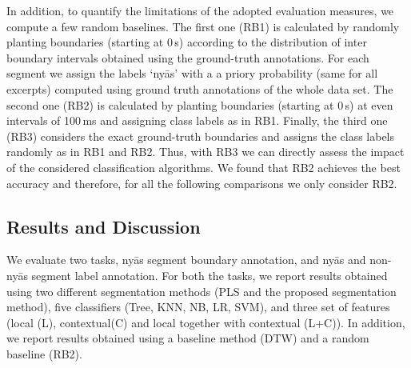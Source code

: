 {In addition, to quantify the limitations of the adopted evaluation measures, we compute a few random baselines. The first one (RB1) is calculated by randomly planting boundaries (starting at 0\,s) according to the distribution of inter boundary intervals obtained using the ground-truth annotations. For each segment we assign the labels `ny\={a}s' with a a priory probability (same for all excerpts) computed using ground truth annotations of the whole data set. The second one (RB2) is calculated by planting boundaries (starting at 0\,s) at even intervals of 100\,ms and assigning class labels as in RB1. Finally, the third one (RB3) considers the exact ground-truth boundaries and assigns the class labels randomly as in RB1 and RB2. Thus, with RB3 we can directly assess the impact of the considered classification algorithms. We found that RB2 achieves the best accuracy and therefore, for all the following comparisons we only consider RB2.

%

\subsection{Results and Discussion}
\label{ResultsAndDiscussion}


We evaluate two tasks, ny\={a}s segment boundary annotation, and ny\={a}s and non-ny\={a}s segment label annotation. For both the tasks, we report results obtained using two different segmentation methods (PLS and the proposed segmentation method), five classifiers (Tree, KNN, NB, LR, SVM), and three set of features (local (L), contextual(C) and local together with contextual (L+C)). In addition, we report results obtained using a baseline method (DTW) and a random baseline (RB2).


}
